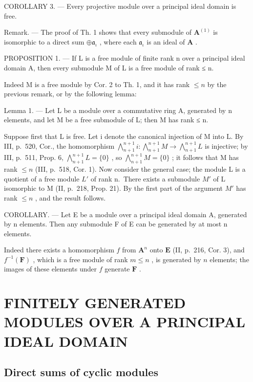 COROLLARY 3. --- Every projective module over a principal ideal domain is free.

Remark. --- The proof of Th. 1 shows that every submodule of \(\mathbf{A}^{(1)}\) is isomorphic to a direct sum \(\oplus \mathfrak{a}_{\iota}\) , where each \(\mathfrak{a}_{\iota}\) is an ideal of \(\mathbf{A}\) .

PROPOSITION 1. --- If L is a free module of finite rank n over a principal ideal domain A, then every submodule M of L is a free module of rank ≤ n.

Indeed M is a free module by Cor. 2 to Th. 1, and it has rank \(\leqslant n\) by the previous remark, or by the following lemma:

Lemma 1. --- Let L be a module over a commutative ring A, generated by n elements, and let M be a free submodule of L; then M has rank ≤ n.

Suppose first that L is free. Let i denote the canonical injection of M into L. By III, p.~520, Cor., the homomorphism \(\bigwedge_{n+1}^{n+1} i: \bigwedge_{n+1}^{n+1} M \to \bigwedge_{n+1}^{n+1} L\) is injective; by III, p.~511, Prop. 6, \(\bigwedge_{n+1}^{n+1} L = \{0\}\) , so \(\bigwedge_{n+1}^{n+1} M = \{0\}\) ; it follows that M has rank \(\leqslant n\) (III, p.~518, Cor. 1). Now consider the general case; the module L is a quotient of a free module \(L'\) of rank n.~There exists a submodule \(M'\) of L isomorphic to M (II, p.~218, Prop. 21). By the first part of the argument \(M'\) has rank \(\leqslant n\) , and the result follows.

COROLLARY. --- Let E be a module over a principal ideal domain A, generated by n elements. Then any submodule F of E can be generated by at most n elements.

Indeed there exists a homomorphism \(f\) from \(\mathbf{A}^n\) onto \(\mathbf{E}\) (II, p.~216, Cor. 3), and \(f^{-1}(\mathbf{F})\) , which is a free module of rank \(m \leqslant n\) , is generated by \(n\) elements; the images of these elements under \(f\) generate \(\mathbf{F}\) .

\section{FINITELY GENERATED MODULES OVER A PRINCIPAL IDEAL DOMAIN}

\subsection{Direct sums of cyclic modules}

